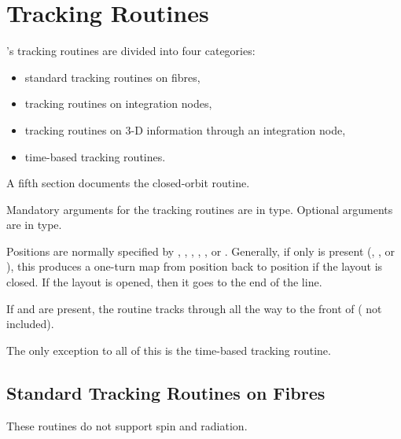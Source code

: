 
\chapter{Tracking Routines}
\label{cha:tracking}

%
\PTC's tracking routines are divided into four categories:

\begin{itemize}
  \item standard tracking routines on fibres,
  \item tracking routines on integration nodes,
  \item tracking routines on 3-D information through an integration node,
  \item time-based tracking routines.
\end{itemize}

A fifth section documents the closed-orbit routine.

Mandatory arguments for the tracking routines are in
 type. Optional arguments are in \ptc{\textit{\textcolor{red}{red italic}}} type.

%
Positions are normally specified by , , ,
, , or . Generally, if only
 is present (, , or ), this produces a
one-turn map from position  back to position  if the layout
is closed. If the layout is opened, then it goes to the end of the line.

If  and  are present, the routine tracks through  all
the way to the front of  ( not included).

The only exception to all of this is the time-based tracking routine.



\section{Standard Tracking Routines on Fibres}

%
These routines do not support spin and radiation.



